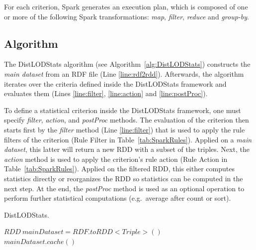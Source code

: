  For each criterion, Spark generates an execution plan, which is composed of one or more of the following Spark transformations: \textit{map}, \textit{filter}, \textit{reduce} and \textit{group-by}. 

\subsection{Algorithm}
\label{sec:Algorithm}
The DistLODStats algorithm (see Algorithm~\ref{alg:DistLODStats}) constructs the \emph{main dataset} from an \gls{RDF} file (Line \ref{line:rdf2rdd}).
Afterwards, the algorithm iterates over the criteria defined inside the DistLODStats framework and evaluates them (Lines \ref{line:filter}, \ref{line:action} and \ref{line:postProc}).

To define a statistical criterion inside the DistLODStats framework, one must specify \emph{filter}, \emph{action}, and \emph{postProc} methods. 
The evaluation of the criterion then starts first by the \emph{filter} method (Line \ref{line:filter}) that is used to apply the rule filters of the criterion (Rule Filter in Table~\ref{tab:SparkRules}). 
Applied on a \emph{main dataset}, this latter will return a new \gls{RDD} with a subset of the triples.
Next, the \emph{action} method is used to apply the criterion's rule action (Rule Action in Table~\ref{tab:SparkRules}).
Applied on the filtered \gls{RDD}, this either computes statistics directly or reorganizes the \gls{RDD} so statistics can be computed in the next step.
At the end, the \emph{postProc} method is used as an optional operation to perform further statistical computations (e.g.~average after count or sort).

\begin{algorithm}
\caption{DistLODStats.}
\label{alg:DistLODStats}
    $RDD~\textit{mainDataset} = RDF.toRDD<Triple>()$ \label{line:rdf2rdd} \\
    $\textit{mainDataset}.cache() $ \label{line:cache}\\
\end{algorithm}

